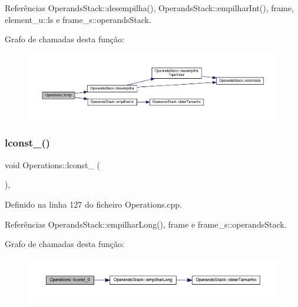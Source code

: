 Referências Operands\+Stack\+::desempilha(), Operands\+Stack\+::empilhar\+Int(), frame, element\+\_\+u\+::ls e frame\+\_\+s\+::operands\+Stack.

Grafo de chamadas desta função\+:
\nopagebreak
\begin{figure}[H]
\begin{center}
\leavevmode
\includegraphics[width=350pt]{classOperations_a7ad4ad0e417096686b55dde9142b830a_cgraph}
\end{center}
\end{figure}
\mbox{\label{classOperations_a89586a819a6e67c2168d7d6e43f087ef}} 
\subsubsection{\texorpdfstring{lconst\+\_()}{lconst\_0()}}
{\footnotesize\ttfamily void Operations\+::lconst\+\_ (\begin{DoxyParamCaption}{ }\end{DoxyParamCaption})\hspace{0.3cm}{\ttfamily [static]}, {\ttfamily [private]}}



Definido na linha 127 do ficheiro Operations.\+cpp.



Referências Operands\+Stack\+::empilhar\+Long(), frame e frame\+\_\+s\+::operands\+Stack.

Grafo de chamadas desta função\+:
\nopagebreak
\begin{figure}[H]
\begin{center}
\leavevmode
\includegraphics[width=350pt]{classOperations_a89586a819a6e67c2168d7d6e43f087ef_cgraph}
\end{center}
\end{figure}
\mbox{\label{classOperations_ae6c6a8e3d75dec712e534434f85909ce}} 
